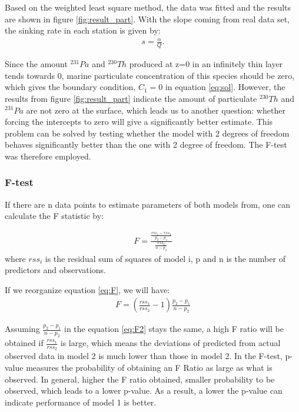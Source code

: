 \documentclass[paper=a4, fontsize=11pt]{scrartcl} %
\numberwithin{equation}{section} %
\numberwithin{figure}{section} %
\numberwithin{table}{section} %
\begin{document}
Based on the weighted least square method, the data was fitted and the results are shown in figure \ref{fig:result_part}. With the slope coming from real data set, the sinking rate in each station is given by:
\begin{align}
\label{eq:para_s}
s=\frac{\alpha}{Q}.
\end{align}

Since the amount $^{231}Pa$ and $^{230}Th$  produced at z=0 in an infinitely thin layer tends towards 0, marine particulate concentration of this species should be zero, which gives the boundary condition, $C_{1}=0$ in equation \ref{eq:sol}. However, the results from figure \ref{fig:result_part} indicate the amount of particulate $^{230}Th$ and $^{231}Pa$ are not zero at the surface, which leads us to another question: whether forcing the intercepts to zero will give a significantly better estimate. This problem can be solved by testing whether the model with 2 degrees of freedom behaves significantly better than the one with 2 degree of freedom. The F-test was therefore employed.

\subsubsection{F-test}
If there are n data points to estimate parameters of both models from, one can calculate the F statistic by:

\begin{align}
\label{eq:F}
F=\frac{\frac{rss_{1}-rss_{2}}{p_{2}-p_{1}}}{\frac{rss_{2}}{n-p_{2}}}
\end{align}
where $rss_{i}$ is the residual sum of squares of model i, p and n is the number of predictors and observations. 

If we reorganize equation \ref{eq:F}, we will have:
\begin{align}
\label{eq:F2}
F=\left(\frac{rss_{1}}{rss_{2}}-1\right){\frac{p_{2}-p_{1}}{n-p_{2}}}
\end{align}

Assuming $\frac{p_{2}-p_{1}}{n-p_{2}}$ in the equation \ref{eq:F2} stays the same, a high F ratio will be obtained if $\frac{rss_{1}}{rss_{2}}$ is large, which means the deviations of predicted from actual observed data in model 2 is much lower than those in model 2. In the F-test, p-value measures the probability of obtaining an F Ratio as large as what is observed. In general, higher the F ratio obtained, smaller probability to be observed, which leads to a lower p-value. As a result, a lower the p-value can indicate performance of model 1 is better. 
\end{document}
